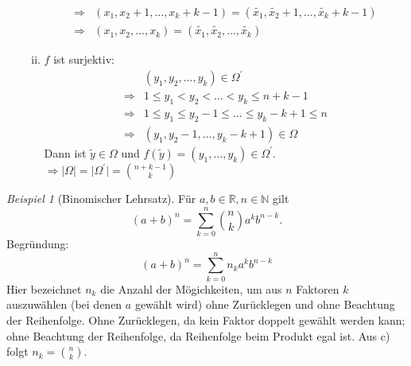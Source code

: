 \documentclass[a4paper,12pt,fleqn]{scrartcl}
\newcommand{\N}{\mathbb{N}}
\newcommand{\R}{\mathbb{R}}
\newcommand{\impl}{\Rightarrow}
\theoremstyle{definition}
\theoremstyle{plain}
\theoremstyle{remark}
\newtheorem{beispiel}[definition]{Beispiel}
\begin{document}
\begin{enumerate}[a)]
\begin{enumerate}[(i)]
\begin{align*}
\impl & (x_1, x_2+1, \ldots, x_k+k-1) = (\widetilde{x_1}, \widetilde{x_2}+1, \ldots, \widetilde{x_k}+k-1) \\
\impl & (x_1, x_2, \ldots, x_k) = (\widetilde{x_1}, \widetilde{x_2}, \ldots, \widetilde{x_k})
\end{align*}
\item $f$ ist surjektiv:
\begin{align*}
&(y_1, y_2, \ldots, y_k) \in \Omega^\prime \\
\impl & 1 \leq y_1 < y_2 <\ldots < y_k \leq n+k-1 \\
\impl & 1 \leq y_1 \leq y_2-1 \leq \ldots \leq y_k-k+1 \leq n \\
\impl & (y_1,y_2-1, \ldots , y_k-k+1) \in \Omega
\end{align*}
Dann ist $\widetilde{y} \in \Omega$ und $f(\widetilde{y})=(y_1, \ldots, y_k) \in \Omega^\prime$. \\
$\impl \mid \Omega \mid = \mid \Omega^\prime \mid = \binom{n+k-1}{k}$
\end{enumerate}
\end{enumerate}
\begin{beispiel}[Binomischer Lehrsatz]
Für $a, b \in \R, n \in \N$ gilt 
\[(a+b)^{n} = \sum_{k=0}^{n} \binom{n}{k} a^{k} b^{n-k}.\]
Begründung:
\[(a+b)^{n} = \sum_{k=0}^{n} n_k a^{k} b^{n-k}\]
Hier bezeichnet $n_k$ die Anzahl der Mögichkeiten, um aus $n$ Faktoren $k$ auszuwählen (bei denen $a$ gewählt wird) ohne Zurücklegen und ohne Beachtung der Reihenfolge. Ohne Zurücklegen, da kein Faktor doppelt gewählt werden kann; ohne Beachtung der Reihenfolge, da Reihenfolge beim Produkt egal ist. Aus c) folgt $n_k = \binom{n}{k}$.
\end{beispiel}
\end{document}
